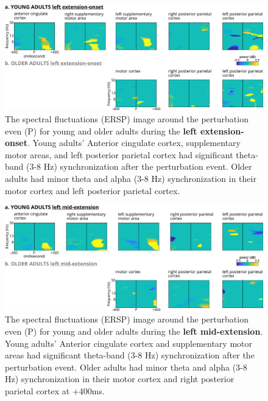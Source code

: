 \documentclass[../thesis_seyed.tex]{subfiles}
\begin{document}
\begin{figure}[tb]
    \centering
    \includegraphics[width=\linewidth]{../img/figure 3 - LEI ERSP.jpg}
    \caption{The spectral fluctuations (ERSP) image around the perturbation even (P) for young and older adults during the \textbf{left extension-onset}. Young adults’ Anterior cingulate cortex, supplementary motor areas, and left posterior parietal cortex had significant theta-band (3-8 Hz) synchronization after the perturbation event. Older adults had minor theta and alpha (3-8 Hz) synchronization in their motor cortex and left posterior parietal cortex.}
    \label{fig:yo_lei}
\end{figure}


\begin{figure}[tb]
    \centering
    \includegraphics[width=\linewidth]{../img/figure 4 - LME ERSP.jpg}
    \caption{The spectral fluctuations (ERSP) image around the perturbation even (P) for young and older adults during the \textbf{left mid-extension}. Young adults’ Anterior cingulate cortex and supplementary motor areas had significant theta-band (3-8 Hz) synchronization after the perturbation event. Older adults had minor theta and alpha (3-8 Hz) synchronization in their motor cortex and right posterior parietal cortex at +400ms.}
    \label{fig:yo_lme}
\end{figure}
\end{document}
